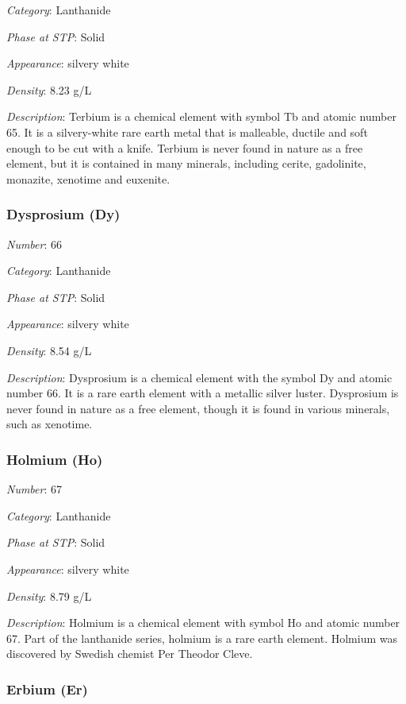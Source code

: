 \documentclass{article}
\begin{document}
\textit{Category}: Lanthanide

\textit{Phase at STP}: Solid

\textit{Appearance}: silvery white

\textit{Density}: 8.23 g/L

\textit{Description}: Terbium is a chemical element with symbol Tb and atomic number 65. It is a silvery-white rare earth metal that is malleable, ductile and soft enough to be cut with a knife. Terbium is never found in nature as a free element, but it is contained in many minerals, including cerite, gadolinite, monazite, xenotime and euxenite.

\hypertarget{subsubsection::Dy}{}\subsubsection{Dysprosium (Dy)}

\textit{Number}: 66

\textit{Category}: Lanthanide

\textit{Phase at STP}: Solid

\textit{Appearance}: silvery white

\textit{Density}: 8.54 g/L

\textit{Description}: Dysprosium is a chemical element with the symbol Dy and atomic number 66. It is a rare earth element with a metallic silver luster. Dysprosium is never found in nature as a free element, though it is found in various minerals, such as xenotime.

\hypertarget{subsubsection::Ho}{}\subsubsection{Holmium (Ho)}

\textit{Number}: 67

\textit{Category}: Lanthanide

\textit{Phase at STP}: Solid

\textit{Appearance}: silvery white

\textit{Density}: 8.79 g/L

\textit{Description}: Holmium is a chemical element with symbol Ho and atomic number 67. Part of the lanthanide series, holmium is a rare earth element. Holmium was discovered by Swedish chemist Per Theodor Cleve.

\hypertarget{subsubsection::Er}{}\subsubsection{Erbium (Er)}
\end{document}

